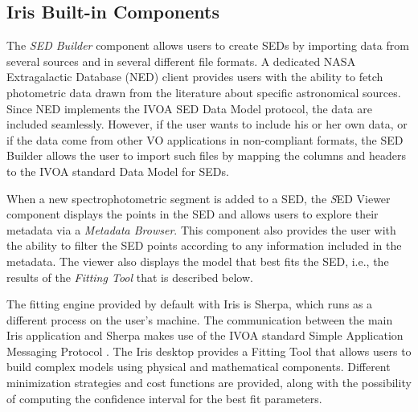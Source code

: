\subsection{Iris Built-in Components}
The \emph{SED Builder} component allows users to create SEDs by importing data from several sources and in several different file formats. A dedicated NASA Extragalactic Database (NED) client provides users with the ability to fetch photometric data drawn from the literature about specific astronomical sources. Since NED implements the IVOA SED Data Model protocol, the data are included seamlessly. However, if the user wants to include his or her own data, or if the data come from other VO applications in non-compliant formats, the SED Builder allows the user to import such files by mapping the columns and headers to the IVOA standard Data Model for SEDs.

When a new spectrophotometric segment is added to a SED, the {\emph SED Viewer} component displays the points in the SED and allows users to explore their metadata via a \emph{Metadata Browser}.  This component also provides the user with the ability to filter the SED points according to any information included in the metadata. The viewer also displays the model that best fits the SED, i.e., the results of the \emph{Fitting Tool} that is described below.

The fitting engine provided by default with Iris is Sherpa, which runs as a different process on the user's machine. The communication between the main Iris application and Sherpa makes use of the IVOA standard Simple Application Messaging Protocol \citep[SAMP;][]{samp1.3}. The Iris desktop provides a Fitting Tool that allows users to build complex models using physical and mathematical components. Different minimization strategies and cost functions are provided, along with the possibility of computing the confidence interval for the best fit parameters.

